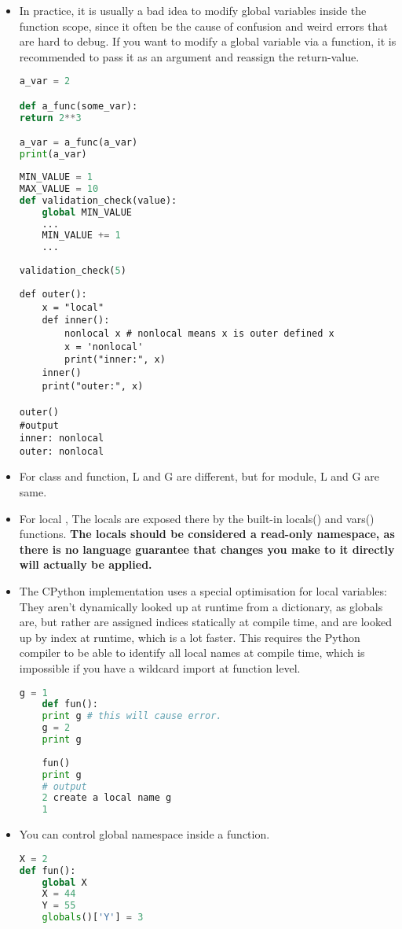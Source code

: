 \documentclass[a4paper,12pt,twoside]{book}
\begin{document}
\begin{itemize}
	\item In practice, it is usually a bad idea to modify global variables inside the function scope, since it often be the cause of confusion and weird errors that are hard to debug.
	If you want to modify a global variable via a function, it is recommended to pass it as an argument and reassign the return-value.
\begin{lstlisting}[frame=single, language=Python]
a_var = 2

def a_func(some_var):
return 2**3

a_var = a_func(a_var)
print(a_var)
\end{lstlisting} 

\begin{lstlisting}[frame=single, language=Python]
MIN_VALUE = 1
MAX_VALUE = 10
def validation_check(value):
	global MIN_VALUE
	...
	MIN_VALUE += 1
	...
	
validation_check(5)
\end{lstlisting} 

\begin{lstlisting}
def outer():
	x = "local"
	def inner():
		nonlocal x # nonlocal means x is outer defined x
		x = 'nonlocal'
		print("inner:", x)
	inner()
	print("outer:", x)
	
outer()
#output
inner: nonlocal
outer: nonlocal
\end{lstlisting}
	
	\item For class and function, L and G are different, but for module, L and G are same.
	\item For local , The locals are exposed there by the built-in locals() and vars() functions. \textbf{The locals should be considered a read-only namespace, as there is no language guarantee that changes you make to it directly will actually be applied.}
		\item The CPython implementation uses a special optimisation for local variables: They aren't dynamically looked up at runtime from a dictionary, as globals are, but rather are assigned indices statically at compile time, and are looked up by index at runtime, which is a lot faster. This requires the Python compiler to be able to identify all local names at compile time, which is impossible if you have a wildcard import at function level.
	\begin{lstlisting}[frame=single, language=Python]
	g = 1
	def fun():
	print g # this will cause error. 
	g = 2
	print g
	
	fun()
	print g
	# output 
	2 create a local name g
	1
	\end{lstlisting}  
	\item You can control global namespace inside a function.
\begin{lstlisting}[frame=single, language=Python]
X = 2
def fun():
	global X
	X = 44
	Y = 55
	globals()['Y'] = 3
	

\end{lstlisting}
\end{itemize}
\end{document}

